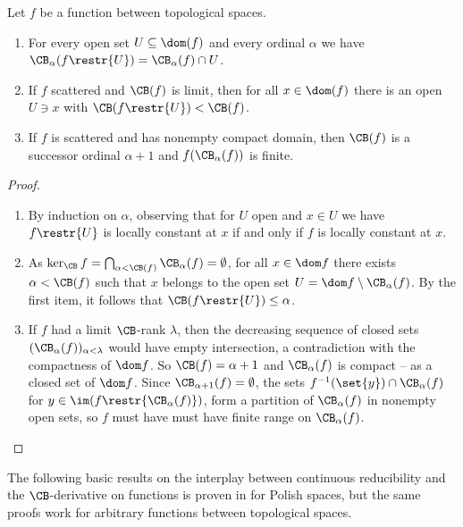 \begin{fact}\label{CBbasics0}
Let $f$ be a function between topological spaces.
\begin{enumerate}
\item For every open set $U\subseteq\dom(f)$ and every ordinal $\alpha$ we have $\CB_\alpha(f\restr{U})=\CB_\alpha(f)\cap U$. \label{CBbasicsfromJSL2}
\item If $f$ scattered and $\CB(f)$ is limit, then for all $x\in\dom(f)$ there is an open $U\ni x$ with $\CB(f\restr{U})<\CB(f)$.
\item If $f$ is scattered and has nonempty compact domain, then $\CB(f)$ is a successor ordinal $\alpha+1$ and $f(\CB_\alpha(f))$ is finite.
\end{enumerate}
\end{fact}

\begin{proof}
\begin{enumerate}
\item {By induction on $\alpha$, observing that} for $U$ open and $x\in U$ we have $f\restr{U}$ is locally constant at $x$ if and only if $f$ is locally constant at $x$. 
\item As $\ker_{\CB}{f}=\bigcap_{\alpha<\CB(f)}\CB_\alpha(f)=\emptyset$, for all $x\in \dom f$ there exists $\alpha<\CB(f)$
such that $x$ belongs to the open set $U=\dom f \setminus \CB_\alpha(f)$. By the first item, it follows that $\CB(f\restr{U})\leq \alpha$. 
\item If $f$ had a limit $\CB$-rank $\lambda$, then the decreasing sequence of closed sets $(\CB_\alpha(f))_{\alpha<\lambda}$ would have empty intersection,
a contradiction with the compactness of $\dom f$.
So $\CB(f)=\alpha+1$ and $\CB_{\alpha}(f)$ is compact -- as a closed set of $\dom f$. Since $\CB_{\alpha+1}(f)=\emptyset$,
the sets $f^{-1}(\set{y})\cap \CB_{\alpha}(f)$ for $y\in \im(f\restr{\CB_\alpha(f)})$, form a partition of $\CB_\alpha(f)$ in nonempty open sets,
so $f$ must have must have finite range on $\CB_\alpha(f)$.\qedhere
\end{enumerate}
\end{proof}

The following basic results on the interplay between continuous reducibility and the $\CB$-derivative on functions is proven in \cite[Proposition 2.2 and Corollary 2.3]{carroy2013quasi} for Polish spaces,
but the same proofs work for arbitrary functions between topological spaces.

